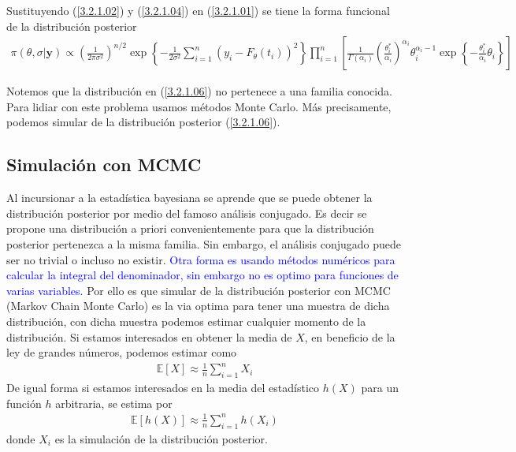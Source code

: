 Sustituyendo (\ref{3.2.1.02}) y (\ref{3.2.1.04}) en (\ref{3.2.1.01}) se tiene la forma funcional de la distribución posterior
\begin{align}
    \pi(\theta, \sigma|\mathbf{y}) \propto \left(\frac{1}{2\pi \sigma^2}\right) ^{n/2}\exp \left \{  -\frac{1}{2\sigma^2}\sum_{i = 1}^{n} \left(y_i - F_{\theta}(t_i)\right)^2 \right \} \prod_{i = 1}^{n} \left[\frac{1}{\Gamma(\alpha_i)}\left(\frac{\theta_i^{*}}{\alpha_i}\right) ^{\alpha_i} \theta_i^{\alpha_i -1} \exp \left \{ -\frac{\theta_i^{*}}{\alpha_i}\theta_i\right \}\right] 
    \label{3.2.1.06}
\end{align}

Notemos que la distribución en (\ref{3.2.1.06}) no pertenece a una familia conocida. Para lidiar con este problema usamos métodos Monte Carlo. Más precisamente, podemos simular de la distribución posterior (\ref{3.2.1.06}).


\subsection{Simulación con MCMC}

Al incursionar a la estadística bayesiana se aprende que se puede obtener la distribución posterior por medio del famoso análisis conjugado. Es decir se propone una distribución a priori convenientemente para que la distribución posterior pertenezca a la misma familia. Sin embargo, el análisis conjugado puede ser no trivial o incluso no existir. \textcolor{blue}{Otra forma es usando métodos numéricos para calcular la integral del denominador, sin embargo no es optimo para funciones de varias variables.}
Por ello es que simular de la distribución posterior con MCMC (Markov Chain Monte Carlo) es la via optima para tener una muestra de dicha distribución, con dicha muestra podemos estimar cualquier momento de la distribución. Si estamos interesados en obtener la media de $X$, en beneficio de la ley de grandes números, podemos estimar como
\begin{align}
    \mathbb{E}\left [X\right ] \approx \frac{1}{n}\sum_{i = 1}^{n} X_i
\end{align}
De igual forma si estamos interesados en la media del estadístico $h(X)$ para un función $h$ arbitraria, se estima por
\begin{align}
    \mathbb{E}\left [h(X)\right ] \approx \frac{1}{n} \sum_{i=1}^{n} h(X_i)
    \label{3.2.2.01}
\end{align}
donde $X_i$ es la simulación de la distribución posterior. 

